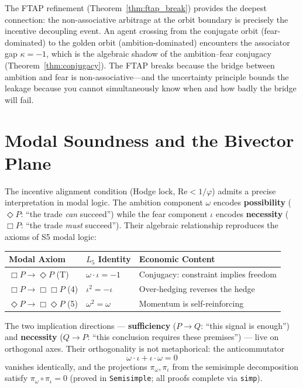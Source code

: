 The FTAP refinement (Theorem~\ref{thm:ftap_break}) provides the deepest connection: the non-associative arbitrage at the orbit boundary is precisely the incentive decoupling event. An agent crossing from the conjugate orbit (fear-dominated) to the golden orbit (ambition-dominated) encounters the associator gap $\kappa = -1$, which is the algebraic shadow of the ambition--fear conjugacy (Theorem~\ref{thm:conjugacy}). The FTAP breaks because the bridge between ambition and fear is non-associative---and the uncertainty principle bounds the leakage because you cannot simultaneously know when and how badly the bridge will fail.

\section{Modal Soundness and the Bivector Plane}

The incentive alignment condition (Hodge lock, $\mathrm{Re} < 1/\varphi$) admits a precise interpretation in modal logic. The ambition component $\omega$ encodes \textbf{possibility} ($\Diamond P$: ``the trade \emph{can} succeed'') while the fear component $\iota$ encodes \textbf{necessity} ($\Box P$: ``the trade \emph{must} succeed''). Their algebraic relationship reproduces the axioms of S5 modal logic:

\begin{center}\small
\begin{tabular}{@{}lll@{}}
\toprule
\textbf{Modal Axiom} & \textbf{$L_5$ Identity} & \textbf{Economic Content} \\
\midrule
$\Box P \to \Diamond P$ (T) & $\omega \cdot \iota = -1$ & Conjugacy: constraint implies freedom \\
$\Box P \to \Box\Box P$ (4) & $\iota^2 = -\iota$ & Over-hedging reverses the hedge \\
$\Diamond P \to \Box\Diamond P$ (5) & $\omega^2 = \omega$ & Momentum is self-reinforcing \\
\bottomrule
\end{tabular}
\end{center}

The two implication directions --- \textbf{sufficiency} ($P \to Q$: ``this signal is enough'') and \textbf{necessity} ($Q \to P$: ``this conclusion requires these premises'') --- live on orthogonal axes. Their orthogonality is not metaphorical: the anticommutator
\begin{equation}\label{eq:anticommutator}
    \omega \cdot \iota + \iota \cdot \omega = 0
\end{equation}
vanishes identically, and the projections $\pi_\omega, \pi_\iota$ from the semisimple decomposition satisfy $\pi_\omega \circ \pi_\iota = 0$ (proved in \texttt{Semisimple}; all proofs complete via \texttt{simp}).

